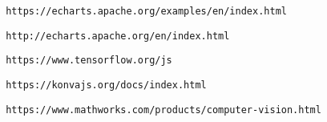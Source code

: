 \begin{thebibliography}{99}
 \begin{verbatim} https://echarts.apache.org/examples/en/index.html 
\end{verbatim}

 \begin{verbatim} http://echarts.apache.org/en/index.html 
\end{verbatim}

 \begin{verbatim} https://www.tensorflow.org/js 
\end{verbatim}

 \begin{verbatim} https://konvajs.org/docs/index.html
\end{verbatim}

 \begin{verbatim} https://www.mathworks.com/products/computer-vision.html
\end{verbatim}


\end{thebibliography}

